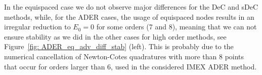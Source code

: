 In the equispaced case we do not observe major differences for the DeC and sDeC methods, 
while, for the ADER cases, the usage of equispaced nodes results in an irregular reduction to $E_0=0$ for some orders (7 and 8), meaning that we can not ensure stability as we did in the other cases for high order methods, see Figure~\ref{fig: ADER_eq_adv_diff_stab} (left). 
This is probably due to the numerical cancellation of Newton-Cotes quadratures with more than 8 points that occur for orders larger than $6$, used in the considered IMEX ADER method. 




